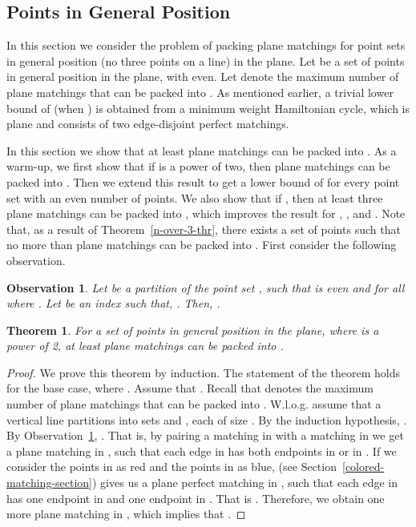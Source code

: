 \documentclass[11pt,a4paper]{article}
\newcommand{\Cut}[2]{\text{\sf Cut}}
\newtheorem{theorem}{Theorem}
\newtheorem{observation}{Observation}
\begin{document}
\subsection{Points in General Position}
\label{general-position-section}
In this section we consider the problem of packing plane matchings for point sets in general position (no three points on a line) in the plane. 
Let  be a set of  points in general position in the plane, with  even. Let  denote the maximum number of plane matchings that can be packed into . As mentioned earlier, a trivial lower bound of  (when ) is obtained from a minimum weight Hamiltonian cycle, which is plane and consists of two edge-disjoint perfect matchings. 

In this section we show that at least  plane matchings can be packed into . As a warm-up, we first show that if  is a power of two, then  plane matchings can be packed into . Then we extend this result to get a lower bound of  for every point set with an even number of points. We also show that if , then at least three plane matchings can be packed into , which improves the result for , , and . Note that, as a result of Theorem~\ref{n-over-3-thr}, there exists a set of  points such that no more than  plane matchings can be packed into . First consider the following observation.

\begin{observation}
\label{partition-obs}
 Let  be a partition of the point set , such that  is even and  for all  where . Let  be an index such that, . Then, .
\end{observation}

\begin{theorem}
\label{n-power2}
For a set  of  points in general position in the plane, where  is a power of 2, at least  plane matchings can be packed into .
\end{theorem}
\begin{proof}
We prove this theorem by induction. The statement of the theorem holds for the base case, where . Assume that . Recall that  denotes the maximum number of plane matchings that can be packed into . W.l.o.g. assume that a vertical line  partitions  into sets  and , each of size . By the induction hypothesis, . By Observation~\ref{partition-obs}, . That is, by pairing a matching  in  with a matching  in  we get a plane matching  in , such that each edge in  has both endpoints in  or in . If we consider the points in  as red and the points in  as blue, \Cut{R}{B} (see Section~\ref{colored-matching-section}) gives us a plane perfect matching  in , such that each edge in  has one endpoint in  and one endpoint in . That is . Therefore, we obtain one more plane matching in , which implies that .
\end{proof}
\end{document}
